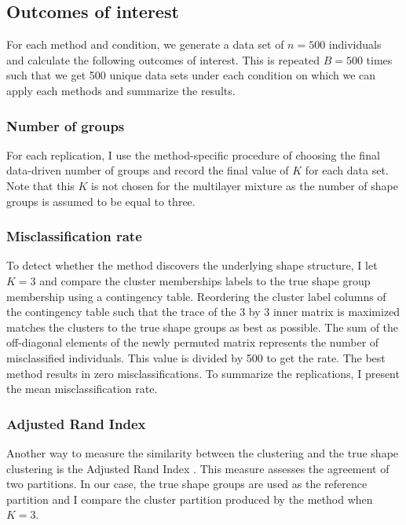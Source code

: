 \subsection{Outcomes of interest}
For each method and condition, we generate a data set of $n=500$ individuals and calculate the following outcomes of interest. This is repeated $B=500$ times such that we get 500 unique data sets under each condition on which we can apply each methods and summarize the results.

\subsubsection{Number of groups}
For each replication, I use the method-specific procedure of choosing the final data-driven number of groups and record the final value of $K$ for each data set. Note that this $K$ is not chosen for the multilayer mixture as the number of shape groups is assumed to be equal to three.

\subsubsection{Misclassification rate}
To detect whether the method discovers the underlying shape structure, I let $K=3$ and compare the cluster memberships labels to the true shape group membership using a contingency table. Reordering the cluster label columns of the contingency table such that the trace of the 3 by 3 inner matrix is maximized matches the clusters to the true shape groups as best as possible. The sum of the off-diagonal elements of the newly permuted matrix represents the number of misclassified individuals. This value is divided by 500 to get the rate. The best method results in zero misclassifications. To summarize the replications, I present the mean misclassification rate.

\subsubsection{Adjusted Rand Index}
Another way to measure the similarity between  the clustering and the true shape clustering is the Adjusted Rand Index \cite{hubert1985,mulligan1985}. This measure assesses the agreement of two partitions. In our case, the true shape groups are used as the reference partition and I compare the cluster partition produced by the method when $K=3$.
 

